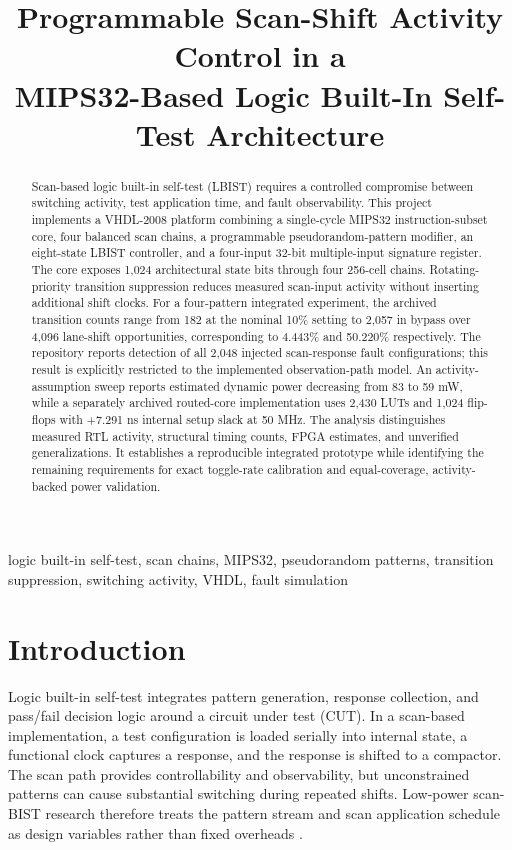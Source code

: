 \documentclass[conference,a4paper]{IEEEtran}
\title{Programmable Scan-Shift Activity Control in a\\MIPS32-Based Logic Built-In Self-Test Architecture}
\begin{document}
\maketitle

\begin{abstract}
Scan-based logic built-in self-test (LBIST) requires a controlled compromise
between switching activity, test application time, and fault observability.
This project implements a VHDL-2008 platform combining a single-cycle MIPS32
instruction-subset core, four balanced scan chains, a programmable
pseudorandom-pattern modifier, an eight-state LBIST controller, and a four-input
32-bit multiple-input signature register. The core exposes 1,024 architectural
state bits through four 256-cell chains. Rotating-priority transition suppression
reduces measured scan-input activity without inserting additional shift clocks.
For a four-pattern integrated experiment, the archived transition counts range
from 182 at the nominal 10\% setting to 2,057 in bypass over 4,096 lane-shift
opportunities, corresponding to 4.443\% and 50.220\% respectively. The repository
reports detection of all 2,048 injected scan-response fault configurations; this
result is explicitly restricted to the implemented observation-path model.
An activity-assumption sweep reports estimated dynamic power decreasing from
83 to 59 mW, while a separately archived routed-core implementation uses
2,430 LUTs and 1,024 flip-flops with +7.291 ns internal setup slack at 50 MHz.
The analysis distinguishes measured RTL activity, structural timing counts,
FPGA estimates, and unverified generalizations. It establishes a reproducible
integrated prototype while identifying the remaining requirements for exact
toggle-rate calibration and equal-coverage, activity-backed power validation.
\end{abstract}

\begin{IEEEkeywords}
logic built-in self-test, scan chains, MIPS32, pseudorandom patterns,
transition suppression, switching activity, VHDL, fault simulation
\end{IEEEkeywords}

\section{Introduction}
Logic built-in self-test integrates pattern generation, response collection,
and pass/fail decision logic around a circuit under test (CUT). In a scan-based
implementation, a test configuration is loaded serially into internal state,
a functional clock captures a response, and the response is shifted to a
compactor. The scan path provides controllability and observability, but
unconstrained patterns can cause substantial switching during repeated shifts.
Low-power scan-BIST research therefore treats the pattern stream and scan
application schedule as design variables rather than fixed overheads
\cite{gerstendorfer}.
\end{document}
